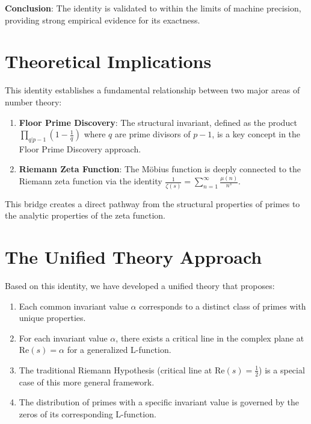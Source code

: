 \documentclass{article}
\begin{document}
\textbf{Conclusion}: The identity is validated to within the limits of machine precision, providing strong empirical evidence for its exactness.

\section{Theoretical Implications}

This identity establishes a fundamental relationship between two major areas of number theory:

\begin{enumerate}
\item \textbf{Floor Prime Discovery}: The structural invariant, defined as the product $\prod_{q|p-1} (1-\frac{1}{q})$ where $q$ are prime divisors of $p-1$, is a key concept in the Floor Prime Discovery approach.

\item \textbf{Riemann Zeta Function}: The Möbius function is deeply connected to the Riemann zeta function via the identity $\frac{1}{\zeta(s)} = \sum_{n=1}^{\infty} \frac{\mu(n)}{n^s}$.
\end{enumerate}

This bridge creates a direct pathway from the structural properties of primes to the analytic properties of the zeta function.

\section{The Unified Theory Approach}

Based on this identity, we have developed a unified theory that proposes:

\begin{enumerate}
\item Each common invariant value $\alpha$ corresponds to a distinct class of primes with unique properties.

\item For each invariant value $\alpha$, there exists a critical line in the complex plane at $\textrm{Re}(s) = \alpha$ for a generalized L-function.

\item The traditional Riemann Hypothesis (critical line at $\textrm{Re}(s) = \frac{1}{2}$) is a special case of this more general framework.

\item The distribution of primes with a specific invariant value is governed by the zeros of its corresponding L-function.
\end{enumerate}
\end{document}
